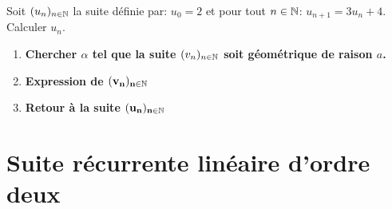 \documentclass[a4paper, 11pt]{article}
\begin{document}
\vspace{0.3cm}
\begin{exemple}
Soit $(u_n)_{n\in \mathbb{N}}$ la suite d\'efinie par: $u_0=2$ et pour tout $n\in\mathbb{N}$: $u_{n+1}=3u_n+4$. Calculer $u_n$.



\begin{enumerate}
\item \textbf{Chercher $\alpha$  tel que la suite $(v_n)_{n\in \mathbb{N}}$ soit g\'eom\'etrique de raison $a$.}
\vspace*{9cm}


\item \textbf{Expression de  $\mathbf{(v_n)_{n\in \mathbb{N}}}$}
\vspace*{3cm}

\item \textbf{Retour à la suite $\mathbf{(u_n)_{n\in \mathbb{N}}}$}
\vspace*{3cm}

\end{enumerate}
\end{exemple}





\newpage
\section{Suite r\'ecurrente lin\'eaire d'ordre deux}
\end{document}
